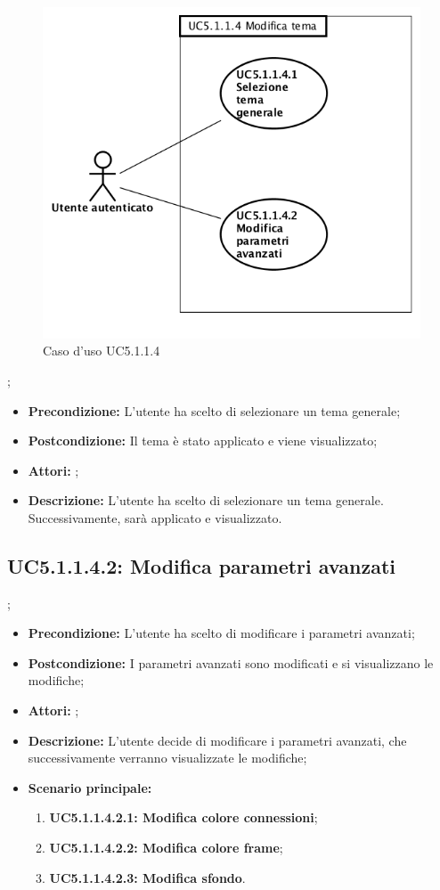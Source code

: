 \begin{figure}[h]
	\begin{center}
	\includegraphics[scale=0.4]{diagram/UC5-1-1-4.png}
	\caption{Caso d'uso UC5.1.1.4}
	\end{center}
\end{figure};
\begin{itemize}
	\item \textbf{Precondizione:} L'utente ha scelto di selezionare un tema generale;
	\item \textbf{Postcondizione:} Il tema è stato applicato e viene visualizzato;
	\item \textbf{Attori:} ;
	\item \textbf{Descrizione:} L'utente ha scelto di selezionare un tema generale. Successivamente, sarà applicato e visualizzato.
\end{itemize}
\subsection{ UC5.1.1.4.2: Modifica parametri avanzati}
;
\begin{itemize}
	\item \textbf{Precondizione:} L'utente ha scelto di modificare i parametri avanzati;
	\item \textbf{Postcondizione:} I parametri avanzati sono modificati e si visualizzano le modifiche;
	\item \textbf{Attori:} ;
	\item \textbf{Descrizione:} L'utente decide di modificare i parametri avanzati, che successivamente verranno visualizzate le modifiche;
	\item \textbf{Scenario principale:}
	\begin{enumerate}
		\item \textbf{ UC5.1.1.4.2.1: Modifica colore connessioni};
		\item \textbf{ UC5.1.1.4.2.2: Modifica colore frame};
		\item \textbf{ UC5.1.1.4.2.3: Modifica sfondo}.
	\end{enumerate}
\end{itemize}
